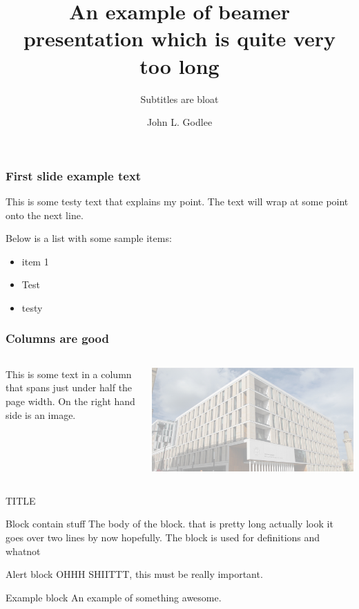 \documentclass[aspectratio=169]{beamer}
\title{An example of beamer presentation which is quite very too long}
\subtitle{Subtitles are bloat}
\author{John L. Godlee}
\begin{document}
\maketitle

\begin{frame}
	\frametitle{First slide example text}
	This is some testy text that explains my point. The text will wrap at some point onto the next line.

	Below is a list with some sample items:

	\begin{itemize}
		\item{item 1}
		\item{Test}
		\item{testy}
	\end{itemize}
\end{frame}

\begin{frame}
	\frametitle{Columns are good}
	\begin{columns}

		This is some text in a column that spans just under half the page width. On the right hand side is an image.

		\includegraphics[width=\textwidth]{background}
	\end{columns}
\end{frame}

\begin{frame}{TITLE}
	\begin{block}{Block contain stuff}
		The body of the block. that is pretty long actually look it goes over two lines by now hopefully. The block is used for definitions and whatnot
	\end{block}
	\begin{alertblock}{Alert block}
		OHHH SHIITTT, this must be really important.
	\end{alertblock}
	\begin{exampleblock}{Example block}
		An example of something awesome.
	\end{exampleblock}
\end{frame}
\end{document}
